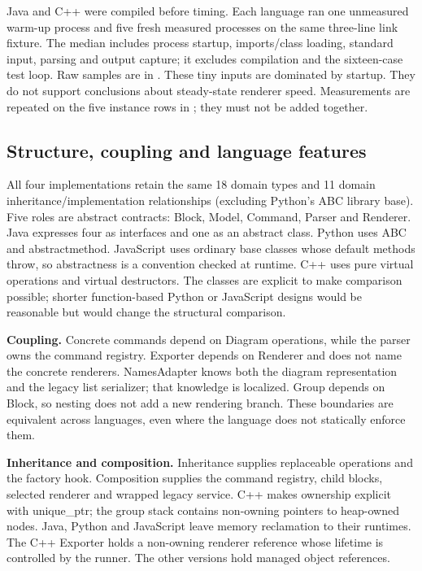 \documentclass[11pt,a4paper]{article}
\begin{document}
Java and C++ were compiled before timing. Each language ran one unmeasured
warm-up process and five fresh measured processes on the same three-line link
fixture. The median includes process startup, imports/class loading, standard
input, parsing and output capture; it excludes compilation and the sixteen-case
test loop. Raw samples are in . These tiny inputs
are dominated by startup. They do not support conclusions about steady-state
renderer speed. Measurements are repeated on the five instance rows in
; they must not be added together.

\subsection{Structure, coupling and language features}
All four implementations retain the same 18 domain types and 11 domain
inheritance/implementation relationships (excluding Python's ABC library base).
Five roles are abstract contracts: Block, Model, Command, Parser and Renderer.
Java expresses four as interfaces and one as an abstract class. Python uses ABC
and abstractmethod. JavaScript uses ordinary base classes whose default methods
throw, so abstractness is a convention checked at runtime. C++ uses pure virtual
operations and virtual destructors. The classes are explicit to make comparison
possible; shorter function-based Python or JavaScript designs would be reasonable
but would change the structural comparison.

\textbf{Coupling.} Concrete commands depend on Diagram operations, while the
parser owns the command registry. Exporter depends on Renderer and does not name
the concrete renderers. NamesAdapter knows both the diagram representation and
the legacy list serializer; that knowledge is localized. Group depends on Block,
so nesting does not add a new rendering branch. These boundaries are equivalent
across languages, even where the language does not statically enforce them.

\textbf{Inheritance and composition.} Inheritance supplies replaceable operations
and the factory hook. Composition supplies the command registry, child blocks,
selected renderer and wrapped legacy service. C++ makes ownership explicit with
unique\_ptr; the group stack contains non-owning pointers to heap-owned nodes.
Java, Python and JavaScript leave memory reclamation to their runtimes. The C++
Exporter holds a non-owning renderer reference whose lifetime is controlled by
the runner. The other versions hold managed object references.
\end{document}

